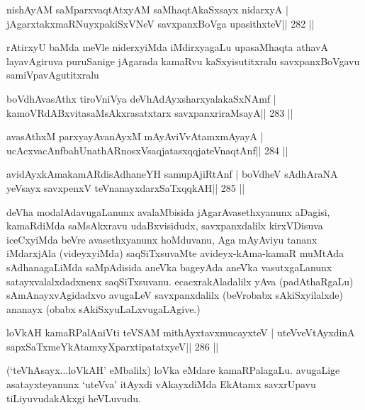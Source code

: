 \begin{shl}
nishAyAM saMparxvaqtAtxyAM saMhaqtAkaSxsayx nidarxyA |
jAgarxtakxmaRNuyxpakiSxVNeV savxpanxBoVga upasithxteV\hfill || 282 ||
\end{shl}

\begin{artha}
rAtirxyU baMda meVle niderxyiMda iMdirxyagaLu upasaMhaqta athavA layavAgiruva puruSanige jAgarada kamaRvu kaSxyisutitxralu savxpanxBoVgavu samiVpavAgutitxralu 
\end{artha}

\begin{shl}
boVdhAvasAthx tiroVniVya deVhAdAyxsharxyalakaSxNAmf |
kamoVRdABxvitasaMsAkxrasatxtarx savxpanxriraMsayA\hfill || 283 ||
\end{shl}

\begin{shl}
avasAthxM parxyayAvanAyxM mAyAviVvA\s\s tamxmAyayA |
ucAcxvacAnfbahUnathARnosxV\s saqjatasxqqjateV\s naqtAnf\hfill || 284 ||
\end{shl}

\begin{shl}
avidAyxkAmakamARdisAdhaneYH samupAjiRtAnf |
boVdheV sAdhAraNA yeV\s sayx savxpenxV teV\s nanayxdarxSaTxqqkAH\hfill || 285 ||
\end{shl}

\begin{artha}
deVha modalAdavugaLanunx avalaMbisida jAgarAvasethxyanunx aDagisi, kamaRdiMda saMsAkxravu udaBxvisidudx, savxpanxdalilx kirxVDisuva iceCxyiMda beVre avasethxyanunx hoMduvanu, Aga mAyAviyu tananx iMdarxjAla (videyxyiMda) saqSiTxsuvaMte avideyx-kAma-kamaR muMtAda sAdhanagaLiMda saMpAdisida aneVka bageyAda aneVka vasutxgaLanunx satayxvalalxdadxnenx saqSiTxsuvanu. ecacxrakAladalilx yAva (padAthaRgaLu) sAmAnayxvAgidadxvo avugaLeV savxpanxdalilx (beVrobabx sAkiSxyilalxde) ananayx (obabx sAkiSxyuLaLxvugaLAgive.)
\end{artha}

\begin{shl}
loVkAH kamaRPalAniVti teVSAM mithAyxtavxmucayxteV |
uteVveVtAyxdinA sapxSaTxmeYkAtamxyXparxtipatatxyeV\hfill || 286 ||
\end{shl}

\begin{artha}
(`teVhAsayx...loVkAH' eMbalilx) loVka eMdare kamaRPalagaLu. avugaLige  asatayxteyanunx `uteVva' itAyxdi vAkayxdiMda EkAtamx savxrUpavu tiLiyuvudakAkxgi heVLuvudu.
\end{artha}

